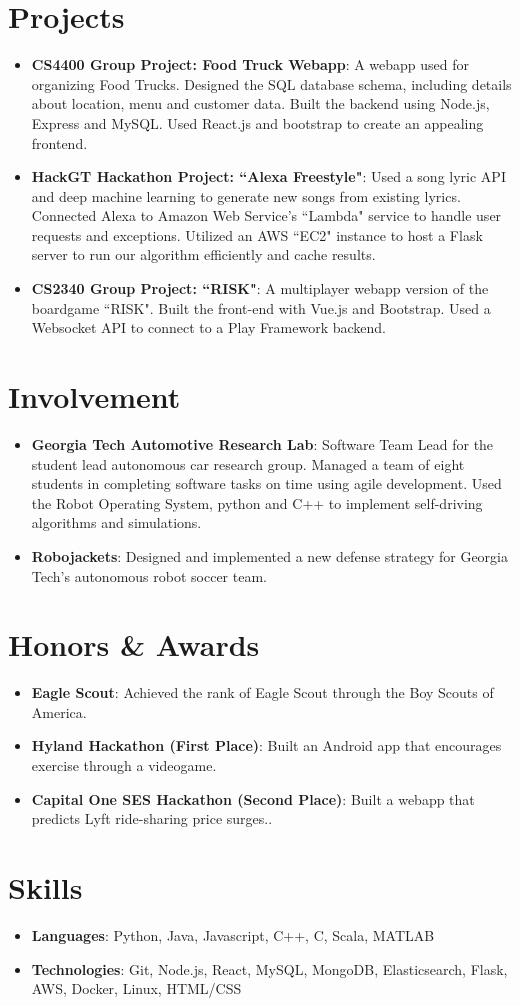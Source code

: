 \documentclass[letterpaper,11pt]{article}
\newcommand{\resumeItem}[2]{
  \item\small{
    \textbf{#1}{: #2 \vspace{-2pt}}
  }
}
\newcommand{\resumeSubItem}[2]{\resumeItem{#1}{#2}\vspace{-4pt}}
\newcommand{\resumeSubHeadingListStart}{\begin{itemize}[leftmargin=*,label={}]}
\newcommand{\resumeSubHeadingListStartBullets}{\begin{itemize}[leftmargin=*]}
\newcommand{\resumeSubHeadingListEnd}{\end{itemize}}
\begin{document}
\section{Projects}
  \resumeSubHeadingListStartBullets
    \resumeSubItem{CS4400 Group Project: Food Truck Webapp}
      {A webapp used for organizing Food Trucks. Designed the SQL database schema, including details about location, menu and customer data. Built the backend using Node.js, Express and MySQL. Used React.js and bootstrap to create an appealing frontend.}
    \resumeSubItem{HackGT Hackathon Project: ``Alexa Freestyle"}
      {Used a song lyric API and deep machine learning to generate new songs from existing lyrics. Connected Alexa to Amazon Web Service's ``Lambda" service to handle user requests and exceptions. Utilized an AWS ``EC2" instance to host a Flask server to run our algorithm efficiently and cache results.}
    \resumeSubItem{CS2340 Group Project: ``RISK"}
      {A multiplayer webapp version of the boardgame ``RISK". Built the front-end with Vue.js and Bootstrap. Used a Websocket API to connect to a Play Framework backend.}
  \resumeSubHeadingListEnd
  
\section{Involvement}
  \resumeSubHeadingListStartBullets
    \resumeSubItem{Georgia Tech Automotive Research Lab}
      {Software Team Lead for the student lead autonomous car research group. Managed a team of eight students in completing software tasks on time using agile development. Used the Robot Operating System, python and C++ to implement self-driving algorithms and simulations.}
    \resumeSubItem{Robojackets}
      {Designed and implemented a new defense strategy for Georgia Tech's autonomous robot soccer team.}
  \resumeSubHeadingListEnd
  
\section{Honors \& Awards}
  \resumeSubHeadingListStartBullets
    \resumeSubItem{Eagle Scout}
      {Achieved the rank of Eagle Scout through the Boy Scouts of America.}
  \resumeSubItem{Hyland Hackathon (First Place)}
      {Built an Android app that encourages exercise through a videogame.}  
  \resumeSubItem{Capital One SES Hackathon (Second Place)}
      {Built a webapp that predicts Lyft ride-sharing price surges..}      
  \resumeSubHeadingListEnd

\section{Skills}
  \resumeSubHeadingListStart
    \resumeSubItem{Languages}
      {Python, Java, Javascript, C++, C, Scala, MATLAB}
    \resumeSubItem{Technologies}
      {Git, Node.js, React, MySQL, MongoDB, Elasticsearch, Flask, AWS, Docker, Linux, HTML/CSS}
  \resumeSubHeadingListEnd


\end{document}
